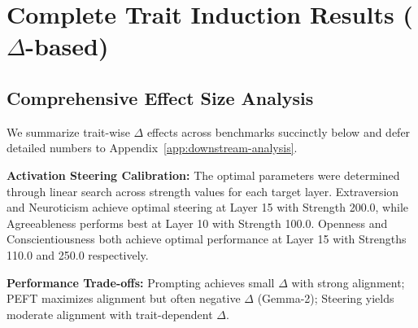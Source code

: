 \section{Complete Trait Induction Results (\(\Delta\)-based)}
\label{app:trait-results}

\subsection{Comprehensive Effect Size Analysis}

We summarize trait-wise \(\Delta\) effects across benchmarks succinctly below and defer detailed numbers to Appendix~\ref{app:downstream-analysis}.

\textbf{Activation Steering Calibration:} The optimal parameters were determined through linear search across strength values for each target layer. Extraversion and Neuroticism achieve optimal steering at Layer 15 with Strength 200.0, while Agreeableness performs best at Layer 10 with Strength 100.0. Openness and Conscientiousness both achieve optimal performance at Layer 15 with Strengths 110.0 and 250.0 respectively.

\textbf{Performance Trade-offs:} Prompting achieves small \(\Delta\) with strong alignment; PEFT maximizes alignment but often negative \(\Delta\) (Gemma-2); Steering yields moderate alignment with trait-dependent \(\Delta\).
